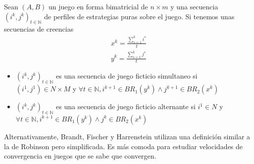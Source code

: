 \begin{definition} \label{def:fp:brown}
    Sean $(A, B)$ un juego en forma bimatricial de $n \times m$ y una secuencia $(i^k, j^k)_{t \in \mathbb{N}}$ de perfiles de estrategias puras sobre el juego. Si tenemos unas secuencias de creencias
    \begin{gather}
        x^k= \frac{\sum^k_{s=1} i^s}{t}  \\
        y^k= \frac{\sum^k_{s=1} j^s}{t}
    \end{gather}
    \begin{itemize}
        \item $(i^k, j^k)_{t \in \mathbb{N}}$ es una secuencia de juego ficticio simultaneo si $(i^1, j^1) \in N \times M$ y $\forall t \in \mathbb{N}, i^{k+1} \in BR_1(y^k) \land j^{k+1} \in BR_2(x^k)$
        \item $(i^k, j^k)_{t \in \mathbb{N}}$ es una secuencia de juego ficticio alternante si $i^1 \in N$ y $\forall t \in \mathbb{N}, i^{k+1} \in BR_1(y^k) \land j^{k} \in BR_2(x^k)$
    \end{itemize}
\end{definition}


Alternativamente, Brandt, Fischer y Harrenstein utilizan una definición similar a la de Robinson \cite{robinson:zerosum} pero simplificada. Es más comoda para estudiar velocidades de convergencia en juegos que se sabe que convergen.

